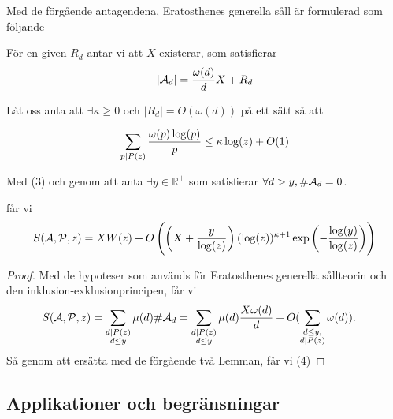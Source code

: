 Med de förgående antagendena, Eratosthenes generella såll är formulerad som följande\cite{Dalton}
\begin{theorem}\hfill

För en given $ R_{d} $ antar vi att $ X $ existerar, som satisfierar
\[\vert\mathcal{A}_{d}\vert =\frac{\omega(d)}{d}X +R_{d} \]

Låt oss anta att $ \exists \kappa\geq 0 $ och $ \vert R_{d}\vert = O(\omega(d))$ på ett sätt så att

\[\sum_{p\mid P(z)}\frac{\omega(p)\log(p)}{p}\leq \kappa \log(z)+O(1)\]


Med (3) och genom att anta $ \exists y\in \mathbb{R}^{+} $ som satisfierar $ \forall d>y, \# \mathcal{A}_d=0 $.

får vi
\begin{equation}
\label{equationEL4}
S(\mathcal{\mathcal{A}}, \mathcal{\mathcal{P}}, z)= XW(z)+O\left( \left( X+\frac{y}{\log(z)} \right)(\log(z))^{\kappa+1}\exp \left( -\frac{\log(y)}{\log(z)} \right) \right)
\end{equation}
\end{theorem}
\begin{proof}
Med de hypoteser som används för Eratosthenes generella sållteorin och den inklusion-exklusionprincipen, får vi
\begin{align*}
S(\mathcal{\mathcal{A}}, \mathcal{\mathcal{P}}, z) &=\sum_{\substack{d\mid P(z)\\d\leq y}}\mu(d)\#\mathcal{A}_{d} =\sum_{\substack{d\mid P(z)\\d\leq y}}\mu(d)\frac{X\omega(d)}{d}+O(\sum_{\substack{d\leq y,\\ d \mid P(z)}} \omega(d)).
\end{align*}
Så genom att ersätta med de förgående två Lemman, får vi (4)
\end{proof}


\subsection{Applikationer och begränsningar}

